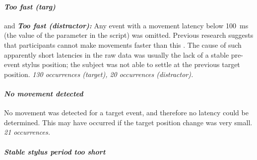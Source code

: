 %

\paragraph{\emph{Too fast (targ)}} and {\bf \emph{Too fast (distractor):}}
Any event with a movement latency below 100~ms (the value of the
parameter  in the
 script) was omitted. Previous research
suggests that participants cannot make movements faster than this
\cite{gielen_coordination_1984,prablanc_optimal_1979}. The cause of
such apparently short latencies in the raw data was usually the lack of
a stable pre-event stylus position; the subject was not able to settle
at the previous target position. \emph{130 occurrences (target), 20
  occurrences (distractor).}

\paragraph{\emph{No movement detected}}

No movement was detected for a target event, and therefore no latency
could be determined. This may have occurred if the target position
change was very small. \emph{21 occurrences.}


\paragraph{\emph{Stable stylus period too short}}

